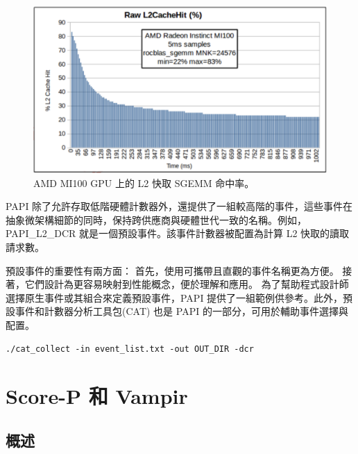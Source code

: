 \begin{figure}
    \centering
    \includegraphics[width=0.9\linewidth]{FileAusiliari/Screenshots/Figure13-6.png}
    \caption{AMD MI100 GPU 上的 L2 快取 SGEMM 命中率。}
    \label{fig:PAPI6}
\end{figure}

PAPI 除了允許存取低階硬體計數器外，還提供了一組較高階的事件，這些事件在抽象微架構細節的同時，保持跨供應商與硬體世代一致的名稱。例如，PAPI\_L2\_DCR 就是一個預設事件。該事件計數器被配置為計算 L2 快取的讀取請求數。

預設事件的重要性有兩方面：
首先，使用可攜帶且直觀的事件名稱更為方便。
接著，它們設計為更容易映射到性能概念，便於理解和應用。
為了幫助程式設計師選擇原生事件或其組合來定義預設事件，PAPI 提供了一組範例供參考。此外，預設事件和計數器分析工具包(CAT) 也是 PAPI 的一部分，可用於輔助事件選擇與配置。





\begin{lstlisting}
./cat_collect -in event_list.txt -out OUT_DIR -dcr
\end{lstlisting}

\section{Score-P 和 Vampir}

\subsection{概述}

